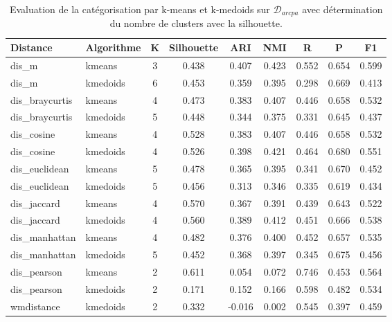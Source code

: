 \begin{table}[!htb]
	\centering \scriptsize
	\begin{tabular}[pos]{|l|l|c|c|c|c|c|c|c|}
		\hline
		\textbf{Distance}& \textbf{Algorithme}& \textbf{K}& \textbf{Silhouette}& \textbf{ARI} & \textbf{NMI} & \textbf{R} & \textbf{P} & \textbf{F1} \\ \hline
		dis\_m          & kmeans    & 3 & 0.438      & 0.407 & 0.423 & 0.552  & 0.654     & 0.599 \\ \hline
		dis\_m          & kmedoids  & 6 & 0.453      & 0.359 & 0.395 & 0.298  & 0.669     & 0.413 \\ \hline
		dis\_braycurtis & kmeans    & 4 & 0.473      & 0.383 & 0.407 & 0.446  & 0.658     & 0.532 \\ \hline
		dis\_braycurtis & kmedoids  & 5 & 0.448      & 0.344 & 0.375 & 0.331  & 0.645     & 0.437 \\ \hline
		dis\_cosine     & kmeans    & 4 & 0.528      & 0.383 & 0.407 & 0.446  & 0.658     & 0.532 \\ \hline
		dis\_cosine     & kmedoids  & 4 & 0.526      & 0.398 & 0.421 & 0.464  & 0.680     & 0.551 \\ \hline
		dis\_euclidean  & kmeans    & 5 & 0.478      & 0.365 & 0.395 & 0.341  & 0.670     & 0.452 \\ \hline
		dis\_euclidean  & kmedoids  & 5 & 0.456      & 0.313 & 0.346 & 0.335  & 0.619     & 0.434 \\ \hline
		dis\_jaccard    & kmeans    & 4 & 0.570      & 0.367 & 0.391 & 0.439  & 0.643     & 0.522 \\ \hline
		dis\_jaccard    & kmedoids  & 4 & 0.560      & 0.389 & 0.412 & 0.451  & 0.666     & 0.538 \\ \hline
		dis\_manhattan  & kmeans    & 4 & 0.482      & 0.376 & 0.400 & 0.452  & 0.657     & 0.535 \\ \hline
		dis\_manhattan  & kmedoids  & 5 & 0.452      & 0.368 & 0.397 & 0.345  & 0.675     & 0.456 \\ \hline
		dis\_pearson    & kmeans    & 2 & 0.611      & 0.054 & 0.072 & 0.746  & 0.453     & 0.564 \\ \hline
		dis\_pearson    & kmedoids  & 2 & 0.171      & 0.152 & 0.166 & 0.598  & 0.482     & 0.534 \\ \hline
		wmdistance      & kmedoids  & 2 & 0.332      & -0.016 & 0.002 & 0.545  & 0.397     & 0.459 \\ \hline
	\end{tabular}
	\caption{Evaluation de la catégorisation par k-means et k-medoids sur $\mathcal{D}_{arcpa}$ avec détermination du nombre de clusters avec la silhouette.} \label{tab:similarite:validation-supervisee-optKbySilhouette}
\end{table}

